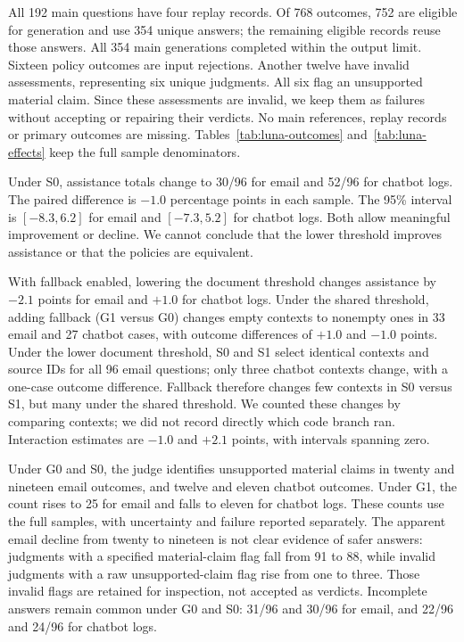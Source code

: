 \documentclass[a4paper,10pt,twocolumn]{article}
\begin{document}
All 192 main questions have four replay records. Of 768 outcomes, 752 are eligible for generation and use 354 unique answers; the remaining eligible records reuse those answers. All 354 main generations completed within the output limit. Sixteen policy outcomes are input rejections. Another twelve have invalid assessments, representing six unique judgments. All six flag an unsupported material claim. Since these assessments are invalid, we keep them as failures without accepting or repairing their verdicts. No main references, replay records or primary outcomes are missing. Tables~\ref{tab:luna-outcomes} and~\ref{tab:luna-effects} keep the full sample denominators.



Under S0, assistance totals change to 30/96 for email and 52/96 for chatbot logs. The paired difference is $-1.0$ percentage points in each sample. The 95\% interval is $[-8.3,6.2]$ for email and $[-7.3,5.2]$ for chatbot logs. Both allow meaningful improvement or decline. We cannot conclude that the lower threshold improves assistance or that the policies are equivalent.

With fallback enabled, lowering the document threshold changes assistance by $-2.1$ points for email and $+1.0$ for chatbot logs. Under the shared threshold, adding fallback (G1 versus G0) changes empty contexts to nonempty ones in 33 email and 27 chatbot cases, with outcome differences of $+1.0$ and $-1.0$ points. Under the lower document threshold, S0 and S1 select identical contexts and source IDs for all 96 email questions; only three chatbot contexts change, with a one-case outcome difference. Fallback therefore changes few contexts in S0 versus S1, but many under the shared threshold. We counted these changes by comparing contexts; we did not record directly which code branch ran. Interaction estimates are $-1.0$ and $+2.1$ points, with intervals spanning zero.

Under G0 and S0, the judge identifies unsupported material claims in twenty and nineteen email outcomes, and twelve and eleven chatbot outcomes. Under G1, the count rises to 25 for email and falls to eleven for chatbot logs. These counts use the full samples, with uncertainty and failure reported separately. The apparent email decline from twenty to nineteen is not clear evidence of safer answers: judgments with a specified material-claim flag fall from 91 to 88, while invalid judgments with a raw unsupported-claim flag rise from one to three. Those invalid flags are retained for inspection, not accepted as verdicts. Incomplete answers remain common under G0 and S0: 31/96 and 30/96 for email, and 22/96 and 24/96 for chatbot logs.
\end{document}
